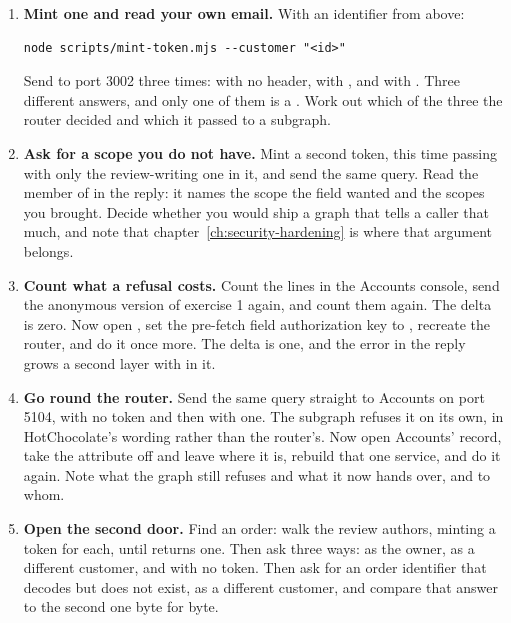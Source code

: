 \begin{enumerate}
  \item \textbf{Mint one and read your own email.} With an identifier from
  above:

  \begin{verbatim}
node scripts/mint-token.mjs --customer "<id>"
  \end{verbatim}

  Send  to port
  3002 three times: with no  header, with
  , and with . Three different
  answers, and only one of them is a . Work out which of the three the
  router decided and which it passed to a subgraph.

  \item \textbf{Ask for a scope you do not have.} Mint a second token, this
  time passing  with only the review-writing one in it, and send
  the same query. Read the  member of  in
  the reply: it names the scope the field wanted and the scopes you brought.
  Decide whether you
  would ship a graph that tells a caller that much, and note that
  chapter~\ref{ch:security-hardening} is where that argument belongs.

  \item \textbf{Count what a refusal costs.} Count the
   lines in the Accounts console, send the
  anonymous version of exercise 1 again, and count them again. The delta is
  zero. Now open , set the pre-fetch field
  authorization key to , recreate the router, and do it once more.
  The delta is one, and the error in the reply grows a second layer with
   in it.

  \item \textbf{Go round the router.} Send the same query straight to Accounts
  on port 5104, with no token and then with one. The subgraph refuses it on its
  own, in HotChocolate's wording rather than the router's. Now open Accounts'
   record, take the \code{[Authorize]} attribute off
   and leave \code{[Authenticated]} where it is, rebuild that one
  service, and do it again. Note what the graph still refuses and what it now
  hands over, and to whom.

  \item \textbf{Open the second door.} Find an order: walk the review authors,
  minting a token for each, until  returns one. Then ask
  three ways: as the owner, as a different customer, and with no token. Then ask
  for an order identifier that decodes but does not exist, as a different
  customer, and compare that answer to the second one byte for byte.


\end{enumerate}
